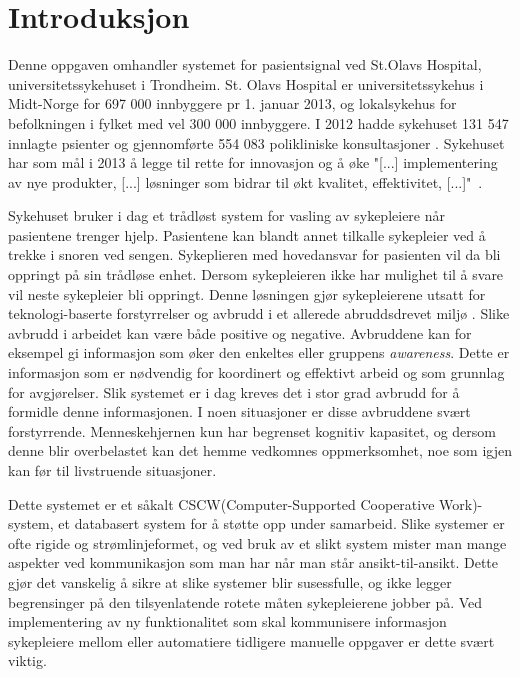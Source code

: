\chapter{Introduksjon}
\label{chp: introduksjon}

Denne oppgaven omhandler systemet for pasientsignal ved St.Olavs Hospital, universitetssykehuset i Trondheim. St. Olavs Hospital er universitetssykehus i Midt-Norge for 697 000 innbyggere pr 1. januar 2013, og lokalsykehus for befolkningen i fylket med vel 300 000 innbyggere. I 2012 hadde sykehuset 131 547 innlagte psienter og gjennomførte 554 083 polikliniske konsultasjoner \cite{stolavs}. Sykehuset har som mål i 2013 å legge til rette for innovasjon og å øke "[...] implementering av nye produkter, [...] løsninger som bidrar til økt kvalitet, effektivitet, [...]"\ \cite{styring13}.

\noindent
Sykehuset bruker i dag et trådløst system for vasling av sykepleiere når pasientene trenger hjelp. Pasientene kan blandt annet tilkalle sykepleier ved å trekke i snoren ved sengen. Sykeplieren med hovedansvar for pasienten vil da bli oppringt på sin trådløse enhet. Dersom sykepleieren ikke har mulighet til å svare vil neste sykepleier bli oppringt. Denne løsningen gjør sykepleierene utsatt for teknologi-baserte forstyrrelser og avbrudd i et allerede abruddsdrevet miljø \cite{Klemets12}. Slike avbrudd i arbeidet kan være både positive og negative. Avbruddene kan for eksempel gi informasjon som øker den enkeltes eller gruppens \emph{awareness}. Dette er informasjon som er nødvendig for koordinert og effektivt arbeid og som grunnlag for avgjørelser. Slik systemet er i dag kreves det i stor grad avbrudd for å formidle denne informasjonen. I noen situasjoner er disse avbruddene svært forstyrrende. Menneskehjernen kun har begrenset kognitiv kapasitet, og dersom denne blir overbelastet kan det hemme vedkomnes oppmerksomhet, noe som igjen kan før til livstruende situasjoner. 

\noindent
Dette systemet er et såkalt CSCW(Computer-Supported Cooperative Work)-system, et databasert system for å støtte opp under samarbeid. Slike systemer er ofte rigide og strømlinjeformet, og ved bruk av et slikt system mister man mange aspekter ved kommunikasjon som man har når man står ansikt-til-ansikt. Dette gjør det vanskelig å sikre at slike systemer blir susessfulle, og ikke legger begrensinger på den tilsyenlatende rotete måten sykepleierene jobber på. Ved implementering av ny funktionalitet som skal kommunisere informasjon sykepleiere mellom eller automatiere tidligere manuelle oppgaver er dette svært viktig. 

